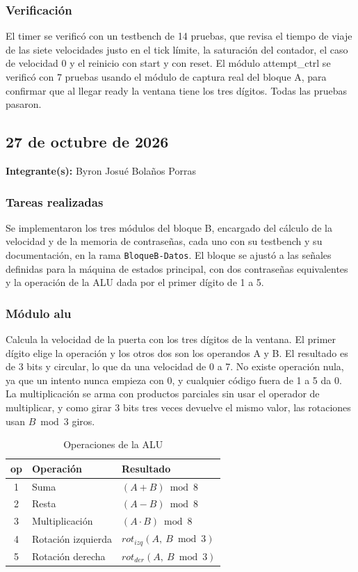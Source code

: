 \documentclass[11pt,letterpaper]{article}
\newcommand{\entrada}[2]{%
  \subsection*{#1}%
  \addcontentsline{toc}{subsection}{#1}%
  \noindent\textbf{Integrante(s):} #2\par\medskip
}
\begin{document}
\subsubsection*{Verificación}
 
El timer se verificó con un testbench de 14 pruebas, que revisa el tiempo de viaje de las siete velocidades justo en el tick límite, la saturación del contador, el caso de velocidad 0 y el reinicio con start y con reset. El módulo attempt\_ctrl se verificó con 7 pruebas usando el módulo de captura real del bloque A, para confirmar que al llegar ready la ventana tiene los tres dígitos. Todas las pruebas pasaron.
 
\entrada{27 de octubre de 2026}{Byron Josué Bolaños Porras}

\subsubsection*{Tareas realizadas}

Se implementaron los tres módulos del bloque B, encargado del cálculo de la velocidad y de la memoria de contraseñas, cada uno con su testbench y su documentación, en la rama \texttt{BloqueB-Datos}. El bloque se ajustó a las señales definidas para la máquina de estados principal, con dos contraseñas equivalentes y la operación de la ALU dada por el primer dígito de 1 a 5.

\subsubsection*{Módulo alu}

Calcula la velocidad de la puerta con los tres dígitos de la ventana. El primer dígito elige la operación y los otros dos son los operandos A y B. El resultado es de 3 bits y circular, lo que da una velocidad de 0 a 7. No existe operación nula, ya que un intento nunca empieza con 0, y cualquier código fuera de 1 a 5 da 0. La multiplicación se arma con productos parciales sin usar el operador de multiplicar, y como girar 3 bits tres veces devuelve el mismo valor, las rotaciones usan $B \bmod 3$ giros.

\begin{table}[H]
\centering
\small
\caption{Operaciones de la ALU}
\begin{tabular}{c l l}
\toprule
\textbf{op} & \textbf{Operación} & \textbf{Resultado} \\
\midrule
1 & Suma & $(A + B) \bmod 8$ \\
2 & Resta & $(A - B) \bmod 8$ \\
3 & Multiplicación & $(A \cdot B) \bmod 8$ \\
4 & Rotación izquierda & $rot_{izq}(A,\ B \bmod 3)$ \\
5 & Rotación derecha & $rot_{der}(A,\ B \bmod 3)$ \\
\bottomrule
\end{tabular}
\end{table}
\end{document}
